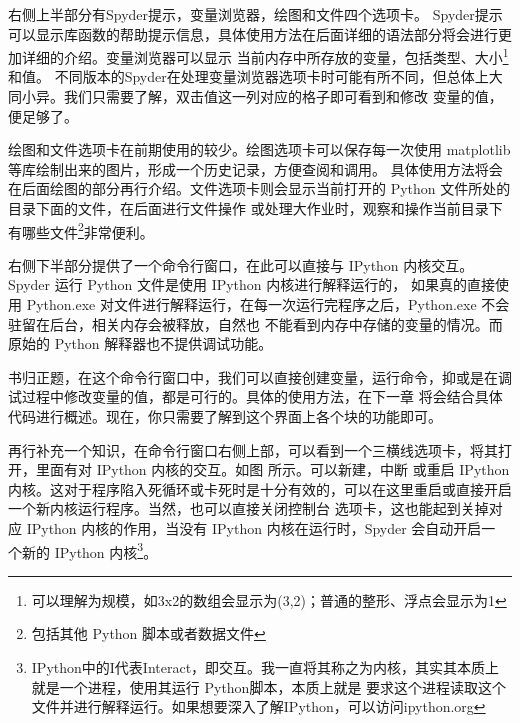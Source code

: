右侧上半部分有Spyder提示，变量浏览器，绘图和文件四个选项卡。
Spyder提示可以显示库函数的帮助提示信息，具体使用方法在后面详细的语法部分将会进行更加详细的介绍。变量浏览器可以显示
当前内存中所存放的变量，包括类型、大小\footnote{可以理解为规模，如3x2的数组会显示为(3,2)；普通的整形、浮点会显示为1}和值。
不同版本的Spyder在处理变量浏览器选项卡时可能有所不同，但总体上大同小异。我们只需要了解，双击值这一列对应的格子即可看到和修改
变量的值，便足够了。

绘图和文件选项卡在前期使用的较少。绘图选项卡可以保存每一次使用 matplotlib 等库绘制出来的图片，形成一个历史记录，方便查阅和调用。
具体使用方法将会在后面绘图的部分再行介绍。文件选项卡则会显示当前打开的 Python 文件所处的目录下面的文件，在后面进行文件操作
或处理大作业时，观察和操作当前目录下有哪些文件\footnote{包括其他 Python 脚本或者数据文件}非常便利。

右侧下半部分提供了一个命令行窗口，在此可以直接与 IPython 内核交互。Spyder 运行 Python 文件是使用 IPython 内核进行解释运行的，
如果真的直接使用 Python.exe 对文件进行解释运行，在每一次运行完程序之后，Python.exe 不会驻留在后台，相关内存会被释放，自然也
不能看到内存中存储的变量的情况。而原始的 Python 解释器也不提供调试功能。

书归正题，在这个命令行窗口中，我们可以直接创建变量，运行命令，抑或是在调试过程中修改变量的值，都是可行的。具体的使用方法，在下一章
将会结合具体代码进行概述。现在，你只需要了解到这个界面上各个块的功能即可。

再行补充一个知识，在命令行窗口右侧上部，可以看到一个三横线选项卡，将其打开，里面有对 IPython 内核的交互。如图 所示。可以新建，中断
或重启 IPython 内核。这对于程序陷入死循环或卡死时是十分有效的，可以在这里重启或直接开启一个新内核运行程序。当然，也可以直接关闭控制台
选项卡，这也能起到关掉对应 IPython 内核的作用，当没有 IPython 内核在运行时，Spyder 会自动开启一
个新的 IPython 内核\footnote{IPython中的I代表Interact，即交互。我一直将其称之为内核，其实其本质上就是一个进程，使用其运行 Python脚本，本质上就是
要求这个进程读取这个文件并进行解释运行。如果想要深入了解IPython，可以访问ipython.org}。